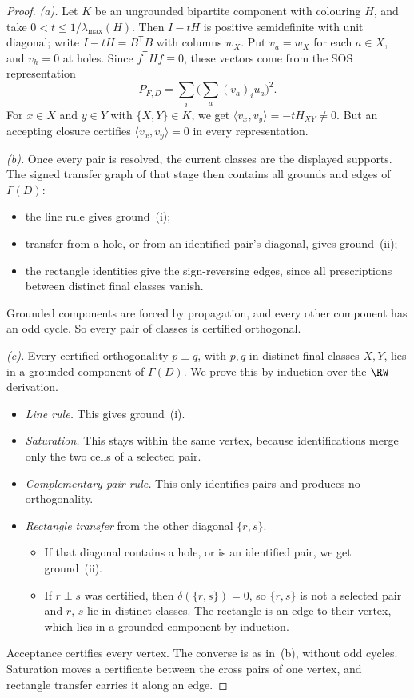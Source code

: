 \begin{proof}
\emph{(a).} Let $K$ be an ungrounded bipartite component with colouring
$H$, and take $0<t\le1/\lambda_{\max}(H)$. Then $I-tH$ is positive
semidefinite with unit diagonal; write $I-tH=B^{\mathsf T}B$ with columns
$w_X$. Put $v_a=w_X$ for each $a\in X$, and $v_h=0$ at holes. Since
$f^{\mathsf T}Hf\equiv0$, these vectors come from the SOS representation
\[
 P_{F,D}=\sum_i\bigl(\textstyle\sum_a(v_a)_iu_a\bigr)^2 .
\]
For $x\in X$ and $y\in Y$ with $\{X,Y\}\in K$, we get
$\langle v_x,v_y\rangle=-tH_{XY}\ne0$. But an accepting closure
certifies $\langle v_x,v_y\rangle=0$ in every representation.

\emph{(b).} Once every pair is resolved, the current classes are the
displayed supports. The signed transfer graph of that stage then contains
all grounds and edges of $\Gamma(D)$:
\begin{itemize}
\item the line rule gives ground~(i);
\item transfer from a hole, or from an identified pair's diagonal, gives
      ground~(ii);
\item the rectangle identities give the sign-reversing edges, since all
      prescriptions between distinct final classes vanish.
\end{itemize}
Grounded components are forced by propagation, and every other component
has an odd cycle. So every pair of classes is certified orthogonal.

\emph{(c).} Every certified orthogonality $p\perp q$, with $p,q$ in
distinct final classes $X,Y$, lies in a grounded component of $\Gamma(D)$.
We prove this by induction over the $\RW$ derivation.
\begin{itemize}
\item \emph{Line rule.} This gives ground~(i).
\item \emph{Saturation.} This stays within the same vertex, because
      identifications merge only the two cells of a selected pair.
\item \emph{Complementary-pair rule.} This only identifies pairs and
      produces no orthogonality.
\item \emph{Rectangle transfer} from the other diagonal $\{r,s\}$.
      \begin{itemize}
      \item If that diagonal contains a hole, or is an identified pair, we
            get ground~(ii).
      \item If $r\perp s$ was certified, then $\delta(\{r,s\})=0$, so
            $\{r,s\}$ is not a selected pair and $r$, $s$ lie in distinct
            classes. The rectangle is an edge to their vertex, which lies in
            a grounded component by induction.
      \end{itemize}
\end{itemize}
Acceptance certifies every vertex. The converse is as in~(b), without
odd cycles. Saturation moves a certificate between the cross pairs of one
vertex, and rectangle transfer carries it along an edge.


\end{proof}
